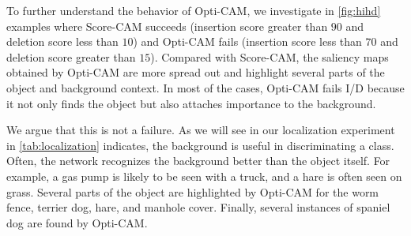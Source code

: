 \noindent To further understand the behavior of Opti-CAM, we investigate in \autoref{fig:hihd} 
examples where Score-CAM succeeds (insertion score greater than $90$ and deletion score less than 
$10$) and Opti-CAM fails (insertion score less than $70$ and deletion score greater than $15$). 
Compared with Score-CAM, the saliency maps obtained by Opti-CAM are more spread out and highlight 
several parts of the object and background context. In most of the cases, Opti-CAM fails I/D because 
it not only finds the object but also attaches importance to the background.

\noindent We argue that this is not a failure. As we will see in our localization experiment in 
\autoref{tab:localization} indicates, the background is useful in discriminating a class. Often, 
the network recognizes the background better than the object itself. For example, a gas pump is 
likely to be seen with a truck, and a hare is often seen on grass. Several parts of the object are 
highlighted by Opti-CAM for the worm fence, terrier dog, hare, and manhole cover. Finally, several 
instances of spaniel dog are found by Opti-CAM.\\